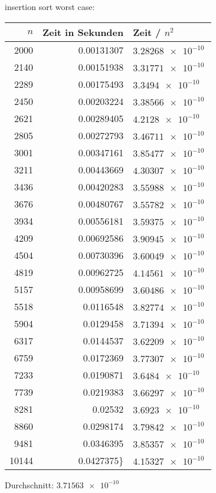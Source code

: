 \documentclass[a4paper]{scrartcl}
\begin{document}
\begin{itemize}
insertion sort worst case:
\begin{center}
\begin{tabular}{rrl}
$n$ & Zeit in Sekunden & Zeit / $n^2$\\
\hline
2000 & 0.00131307 & $\SI{3.28268e-10}{}$\\
2140 & 0.00151938 & $\SI{3.31771e-10}{}$\\
2289 & 0.00175493 & $\SI{3.3494e-10}{}$\\
2450 & 0.00203224 & $\SI{3.38566e-10}{}$\\
2621 & 0.00289405 & $\SI{4.2128e-10}{}$\\
2805 & 0.00272793 & $\SI{3.46711e-10}{}$\\
3001 & 0.00347161 & $\SI{3.85477e-10}{}$\\
3211 & 0.00443669 & $\SI{4.30307e-10}{}$\\
3436 & 0.00420283 & $\SI{3.55988e-10}{}$\\
3676 & 0.00480767 & $\SI{3.55782e-10}{}$\\
3934 & 0.00556181 & $\SI{3.59375e-10}{}$\\
4209 & 0.00692586 & $\SI{3.90945e-10}{}$\\
4504 & 0.00730396 & $\SI{3.60049e-10}{}$\\
4819 & 0.00962725 & $\SI{4.14561e-10}{}$\\
5157 & 0.00958699 & $\SI{3.60486e-10}{}$\\
5518 & 0.0116548 & $\SI{3.82774e-10}{}$\\
5904 & 0.0129458 & $\SI{3.71394e-10}{}$\\
6317 & 0.0144537 & $\SI{3.62209e-10}{}$\\
6759 & 0.0172369 & $\SI{3.77307e-10}{}$\\
7233 & 0.0190871 & $\SI{3.6484e-10}{}$\\
7739 & 0.0219383 & $\SI{3.66297e-10}{}$\\
8281 & 0.02532 & $\SI{3.6923e-10}{}$\\
8860 & 0.0298174 & $\SI{3.79842e-10}{}$\\
9481 & 0.0346395 & $\SI{3.85357e-10}{}$\\
10144 & 0.0427375\} & $\SI{4.15327e-10}{}$\\
\end{tabular}
\end{center}
Durchschnitt: $\SI{3.71563e-10}{}$


\end{itemize}
\end{document}
